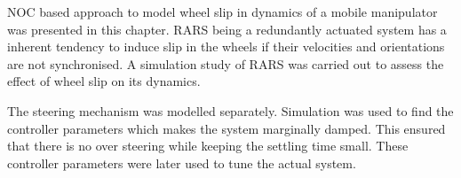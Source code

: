 NOC based approach to model wheel slip in dynamics of a mobile manipulator was presented in this chapter. RARS  being a redundantly actuated system has a inherent tendency to induce slip in the wheels if their velocities and orientations are not synchronised. A simulation study of RARS was carried out to assess the effect of  wheel slip on its dynamics. 

The steering mechanism was modelled separately. Simulation was used to find the   controller parameters which makes the system marginally damped. This ensured that there is no over steering while keeping the settling time small. These controller parameters were later used to tune the actual system.   
    




